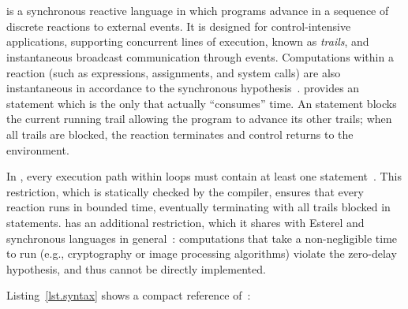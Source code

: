 \section{\CEU}
\label{sec.ceu}

\CEU is a synchronous reactive language in which programs advance in a sequence
of discrete reactions to external events.
%
It is designed for control-intensive applications, supporting concurrent lines
of execution, known as \emph{trails}, and instantaneous broadcast communication
through events.
%
Computations within a reaction (such as expressions, assignments, and
system calls) are also instantaneous in accordance to the synchronous
hypothesis~\cite{rp.hypothesis}.
%
\CEU provides an  statement which is the only that actually
``consumes'' time.
%
An  statement blocks the current running trail allowing the program
to advance its other trails; when all trails are blocked, the reaction
terminates and control returns to the environment.

In \CEU, every execution path within loops must contain at least one
 statement~\cite{ceu.sensys13,esterel.primer}.
%
This restriction, which is statically checked by the compiler, ensures that
every reaction runs in bounded time, eventually terminating with all trails
blocked in  statements.
%
\CEU has an additional restriction, which it shares with Esterel and
synchronous languages in general~\cite{esterel.preemption}: computations that
take a non-negligible time to run (e.g., cryptography or image processing
algorithms) violate the zero-delay hypothesis, and thus cannot be directly
implemented.

Listing~\ref{lst.syntax} shows a compact reference of~\CEU:

